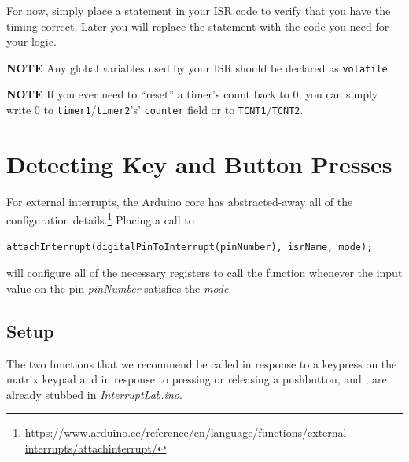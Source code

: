 For now, simply place a  statement in your ISR code to verify
that you have the timing correct. Later you will replace the 
statement with the code you need for your logic.

\textbf{NOTE} Any global variables used by your ISR should be declared as \lstinline{volatile}.

\textbf{NOTE} If you ever need to ``reset'' a timer's count back to 0, you can
simply write 0 to \lstinline{timer1}/\lstinline{timer2}'s' \lstinline{counter}
field or to \texttt{TCNT1}/\texttt{TCNT2}.

\section{Detecting Key and Button Presses}\label{sec:ExternalInterrupts}

For external interrupts, the Arduino core has abstracted-away all of the
configuration details.\footnote{\url{https://www.arduino.cc/reference/en/language/functions/external-interrupts/attachinterrupt/}}
Placing a call to
\begin{lstlisting}
attachInterrupt(digitalPinToInterrupt(pinNumber), isrName, mode);
\end{lstlisting}
will configure all of the necessary registers to call the function
 whenever the input value on the pin \textit{pinNumber}
satisfies the \textit{mode}.

\subsection{Setup}

The two functions that we recommend be called in response to a keypress on the
matrix keypad and in response to pressing or releasing a pushbutton,
 and , are already stubbed
in \textit{InterruptLab.ino}.

